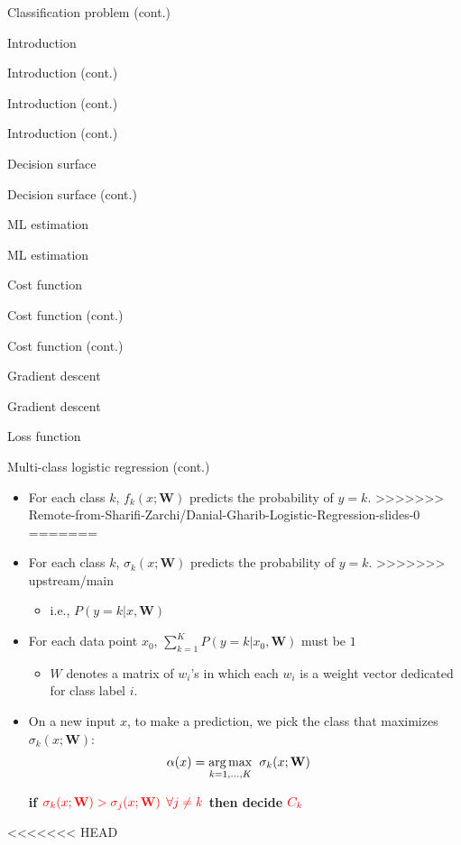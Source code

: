 \documentclass[serif, aspectratio=169]{beamer}
\begin{document}
\begin{frame}{Classification problem (cont.)}
\begin{itemize}
\begin{frame}{Introduction}
\begin{itemize}
\begin{frame}{Introduction (cont.)}
\begin{frame}{Introduction (cont.)}
\begin{frame}{Introduction (cont.)}
\begin{frame}{Decision surface}
\begin{itemize}
\begin{frame}{Decision surface (cont.)}
\begin{frame}{ML estimation}
\begin{frame}{ML estimation}
\begin{itemize}
\begin{frame}{Cost function}
\begin{frame}{Cost function (cont.)}
\begin{itemize}
\begin{itemize}
\begin{frame}{Cost function (cont.)}
\begin{frame}{Gradient descent}
\begin{frame}{Gradient descent}
\begin{frame}{Loss function}
\begin{frame}{Multi-class logistic regression (cont.)}
\begin{itemize}
=======
        \item For each class $k$, $f_k(x; \mathbf{W})$ predicts the probability of $y=k$.
>>>>>>> Remote-from-Sharifi-Zarchi/Danial-Gharib-Logistic-Regression-slides-0
=======
         \item For each class $k$, $\sigma _k(x; \mathbf{W})$ predicts the probability of $y=k$.
>>>>>>> upstream/main
            \begin{itemize}
                \item i.e., $P(y=k|x, \mathbf{W})$
            \end{itemize}
        \item For each data point $x_0$, $\sum _{k=1}^{K} P(y=k|x_0, \mathbf{W})$ must be $1$
            \begin{itemize}
                \item $W$ denotes a matrix of $w_i$'s in which each $w_i$ is a weight vector dedicated for class label $i$.
            \end{itemize}
        \item On a new input $x$, to make a prediction, we pick the class that maximizes $\sigma _k(x; \mathbf{W})$:
            \begin{align*}
                \alpha (x) &= \underset{k=1, \dots , K}{\arg\max} \hspace{0.2cm} \sigma _k(x; \mathbf{W}) 
            \end{align*}
            \begin{center}
                \textbf{if $\color{red} \sigma _k(x; \mathbf{W}) > \sigma _j(x; \mathbf{W})$ $\color{red} \forall j \neq k$ then decide $\color{red} C_k$}
            \end{center}
    \end{itemize}
\end{frame}

<<<<<<< HEAD


\end{frame}
\end{frame}
\end{frame}
\end{frame}
\end{itemize}
\end{itemize}
\end{frame}
\end{frame}
\end{itemize}
\end{frame}
\end{frame}
\end{frame}
\end{itemize}
\end{frame}
\end{frame}
\end{frame}
\end{frame}
\end{itemize}
\end{frame}
\end{itemize}
\end{frame}
\end{document}
